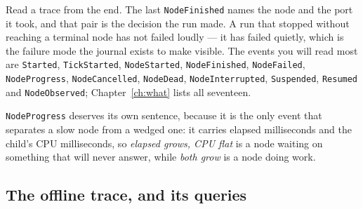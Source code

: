 \begin{center}
\end{center}

Read a trace from the end. The last \texttt{NodeFinished} names the node and the port it
took, and that pair is the decision the run made. A run that stopped without reaching a
terminal node has not failed loudly --- it has failed quietly, which is the failure mode
the journal exists to make visible. The events you will read most are
\texttt{Started}, \texttt{TickStarted}, \texttt{NodeStarted}, \texttt{NodeFinished},
\texttt{NodeFailed}, \texttt{NodeProgress}, \texttt{NodeCancelled}, \texttt{NodeDead},
\texttt{NodeInterrupted}, \texttt{Suspended}, \texttt{Resumed} and \texttt{NodeObserved};
Chapter~\ref{ch:what} lists all seventeen.

\texttt{NodeProgress} deserves its own sentence, because it is the only event that
separates a slow node from a wedged one: it carries elapsed milliseconds and the child's CPU
milliseconds, so \emph{elapsed grows, CPU flat} is a node waiting on something that will
never answer, while \emph{both grow} is a node doing work.

\subsection*{The offline trace, and its queries}

